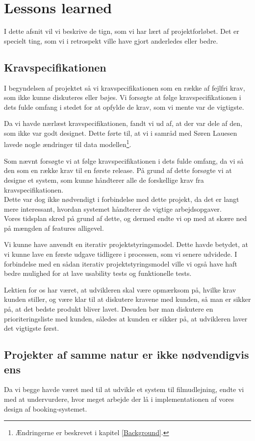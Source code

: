 \section{Lessons learned}
\label{Conclusion_Lessons}
I dette afsnit vil vi beskrive de tign, som vi har lært af projektforløbet. Det er specielt ting, som vi i retrospekt ville have gjort anderledes eller bedre. 

\subsection{Kravspecifikationen}
\label{Conclusion_Lessons_Krav}
I begyndelsen af projektet så vi kravspecifikationen som en række af fejlfri krav, som ikke kunne diskuteres eller bøjes. Vi forsøgte at følge kravspecifikationen i dets fulde omfang i stedet for at opfylde de krav, som vi mente var de vigtigste.

Da vi havde nærlæst kravspecifikationen, fandt vi ud af, at der var dele af den, som ikke var godt designet. Dette førte til, at vi i samråd med Søren Lauesen lavede nogle ændringer til data modellen\footnote{Ændringerne er beskrevet i kapitel \ref{Background}.}.

Som nævnt forsøgte vi at følge kravspecifikationen i dets fulde omfang, da vi så den som en række krav til en første release. På grund af dette forsøgte vi at designe et system, som kunne håndterer alle de forskellige krav fra kravspecifikationen. 
\\Dette var dog ikke nødvendigt i forbindelse med dette projekt, da det er langt mere interessant, hvordan systemet håndterer de vigtige arbejdsopgaver.
\\Vores tidsplan skred på grund af dette, og dermed endte vi op med at skære ned på mængden af features alligevel.

Vi kunne have anvendt en iterativ projektstyringsmodel. Dette havde betydet, at vi kunne lave en første udgave tidligere i processen, som vi senere udvidede. I forbindelse med en sådan iterativ projektstyringsmodel ville vi også have haft bedre mulighed for at lave usability tests og funktionelle tests.

Lektien for os har været, at udvikleren skal være opmærksom på, hvilke krav kunden stiller, og være klar til at diskutere kravene med kunden, så man er sikker på, at det bedste produkt bliver lavet. Desuden bør man diskutere en prioriteringsliste med kunden, således at kunden er sikker på, at udvikleren laver det vigtigste først.

\subsection{Projekter af samme natur er ikke nødvendigvis ens}
\label{Conclusion_Lessons_Projekt}
Da vi begge havde været med til at udvikle et system til filmudlejning, endte vi med at undervurdere, hvor meget arbejde der lå i implementationen af vores design af booking-systemet.

